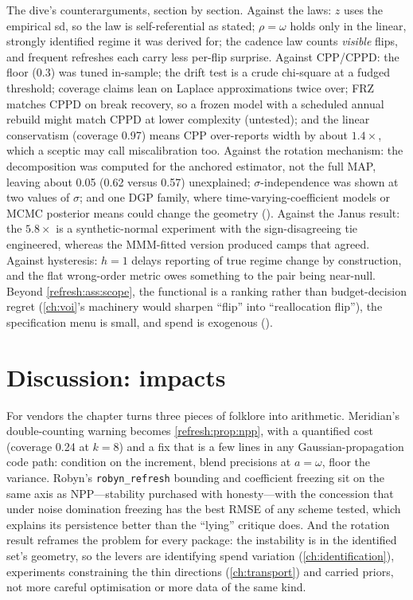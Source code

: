 The dive's counterarguments, section by section. Against the laws: $z$ uses the empirical sd, so the law is self-referential as stated; $\rho = \omega$ holds only in the linear, strongly identified regime it was derived for; the cadence law counts \emph{visible} flips, and frequent refreshes each carry less per-flip surprise. Against CPP/CPPD: the floor (0.3) was tuned in-sample; the drift test is a crude chi-square at a fudged threshold; coverage claims lean on Laplace approximations twice over; FRZ matches CPPD on break recovery, so a frozen model with a scheduled annual rebuild might match CPPD at lower complexity (untested); and the linear conservatism (coverage 0.97) means CPP over-reports width by about $1.4\times$, which a sceptic may call miscalibration too. Against the rotation mechanism: the decomposition was computed for the anchored estimator, not the full MAP, leaving about 0.05 (0.62 versus 0.57) unexplained; $\sigma$-independence was shown at two values of $\sigma$; and one DGP family, where time-varying-coefficient models or MCMC posterior means could change the geometry (). Against the Janus result: the $5.8\times$ is a synthetic-normal experiment with the sign-disagreeing tie engineered, whereas the MMM-fitted version produced camps that agreed. Against hysteresis: $h = 1$ delays reporting of true regime change by construction, and the flat wrong-order metric owes something to the pair being near-null. Beyond \cref{refresh:ass:scope}, the functional is a ranking rather than budget-decision regret (\cref{ch:voi}'s machinery would sharpen ``flip'' into ``reallocation flip''), the specification menu is small, and spend is exogenous ().

\section{Discussion: impacts}

For vendors the chapter turns three pieces of folklore into arithmetic. Meridian's double-counting warning becomes \cref{refresh:prop:npp}, with a quantified cost (coverage 0.24 at $k = 8$) and a fix that is a few lines in any Gaussian-propagation code path: condition on the increment, blend precisions at $a = \omega$, floor the variance. Robyn's \texttt{robyn\_refresh} bounding and coefficient freezing sit on the same axis as NPP---stability purchased with honesty---with the concession that under noise domination freezing has the best RMSE of any scheme tested, which explains its persistence better than the ``lying'' critique does. And the rotation result reframes the problem for every package: the instability is in the identified set's geometry, so the levers are identifying spend variation (\cref{ch:identification}), experiments constraining the thin directions (\cref{ch:transport}) and carried priors, not more careful optimisation or more data of the same kind.

